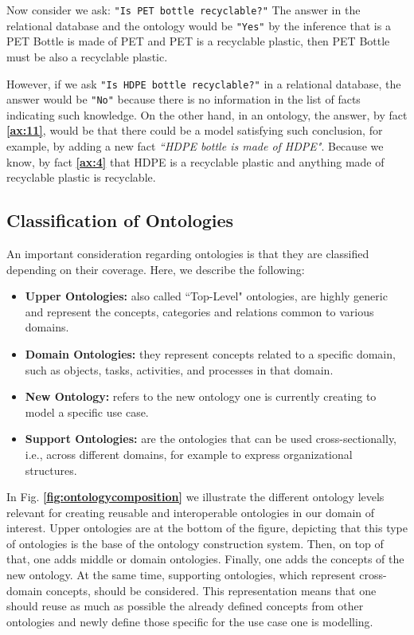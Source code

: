 \documentclass{guideline/sty/rapport}
\begin{document}
    
Now consider we ask: \colorbox{arsenic!20}{\texttt{"Is PET bottle recyclable?"}} The answer in the relational database and the ontology would be \colorbox{junglegreen!50}{\texttt{"Yes"}} by the inference that is a PET Bottle is made of PET and PET is a recyclable plastic, then PET Bottle must be also a recyclable plastic. \singlespacing

However, if we ask \colorbox{arsenic!20}{\texttt{"Is HDPE bottle recyclable?"}} in a relational database, the answer would be \colorbox{pastelred!50}{\texttt{"No"}} because there is no information in the list of facts indicating such knowledge. On the other hand, in an ontology, the answer, by fact \textbf{\ref{ax:11}}, would be that there could be a model satisfying such conclusion, for example, by adding a new fact  \colorbox{arsenic!10}{\textit{``HDPE bottle is made of HDPE"}}. Because we know, by fact \textbf{\ref{ax:4}} that HDPE is a recyclable plastic and anything made of recyclable plastic is recyclable.

\subsection{Classification of Ontologies} \label{sec:classificationontologies}

An important consideration regarding ontologies is that they are classified depending on their coverage. Here, we describe the following: \singlespacing

\begin{itemize}
    \item \textcolor{sapphire}{\textbf{Upper Ontologies:}} also called ``Top-Level" ontologies, are highly generic and represent the concepts, categories and relations common to various domains.
    \item \textcolor{sapphire}{\textbf{Domain Ontologies:}} they represent concepts related to a specific domain, such as objects, tasks, activities, and processes in that domain.
    \item \textcolor{sapphire}{\textbf{New Ontology:}} refers to the new ontology one is currently creating to model a specific use case.
    \item \textcolor{sapphire}{\textbf{Support Ontologies:}} are the ontologies that can be used cross-sectionally, i.e., across different domains, for example to express organizational structures.
\end{itemize} \singlespacing

In Fig. \textbf{\ref{fig:ontologycomposition}} we illustrate the different ontology levels relevant for creating reusable and interoperable ontologies in our domain of interest. Upper ontologies are at the bottom of the figure, depicting that this type of ontologies is the base of the ontology construction system. Then, on top of that, one adds middle or domain ontologies. Finally, one adds the concepts of the new ontology. At the same time, supporting ontologies, which represent cross-domain concepts, should be considered. This representation means that one should reuse as much as possible the already defined concepts from other ontologies and newly define those specific for the use case one is modelling.
\end{document}
